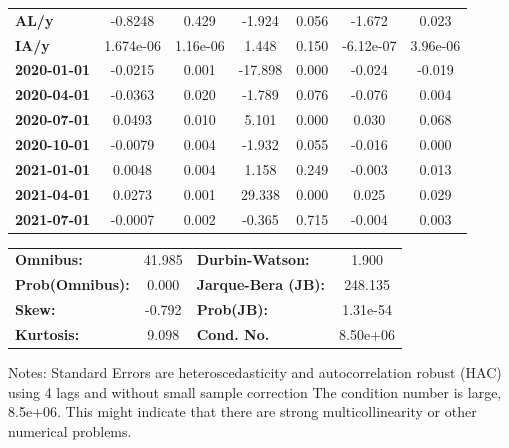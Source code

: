 \begin{center}
\begin{tabular}{lcccccc}
\textbf{AL/y}        &      -0.8248  &        0.429     &    -1.924  &         0.056        &       -1.672    &        0.023     \\
\textbf{IA/y}        &    1.674e-06  &     1.16e-06     &     1.448  &         0.150        &    -6.12e-07    &     3.96e-06     \\
\textbf{2020-01-01}  &      -0.0215  &        0.001     &   -17.898  &         0.000        &       -0.024    &       -0.019     \\
\textbf{2020-04-01}  &      -0.0363  &        0.020     &    -1.789  &         0.076        &       -0.076    &        0.004     \\
\textbf{2020-07-01}  &       0.0493  &        0.010     &     5.101  &         0.000        &        0.030    &        0.068     \\
\textbf{2020-10-01}  &      -0.0079  &        0.004     &    -1.932  &         0.055        &       -0.016    &        0.000     \\
\textbf{2021-01-01}  &       0.0048  &        0.004     &     1.158  &         0.249        &       -0.003    &        0.013     \\
\textbf{2021-04-01}  &       0.0273  &        0.001     &    29.338  &         0.000        &        0.025    &        0.029     \\
\textbf{2021-07-01}  &      -0.0007  &        0.002     &    -0.365  &         0.715        &       -0.004    &        0.003     \\
\bottomrule
\end{tabular}
\begin{tabular}{lclc}
\textbf{Omnibus:}       & 41.985 & \textbf{  Durbin-Watson:     } &    1.900  \\
\textbf{Prob(Omnibus):} &  0.000 & \textbf{  Jarque-Bera (JB):  } &  248.135  \\
\textbf{Skew:}          & -0.792 & \textbf{  Prob(JB):          } & 1.31e-54  \\
\textbf{Kurtosis:}      &  9.098 & \textbf{  Cond. No.          } & 8.50e+06  \\
\bottomrule
\end{tabular}
\end{center}

Notes: \newline
 [1] Standard Errors are heteroscedasticity and autocorrelation robust (HAC) using 4 lags and without small sample correction \newline
 [2] The condition number is large, 8.5e+06. This might indicate that there are \newline
 strong multicollinearity or other numerical problems.